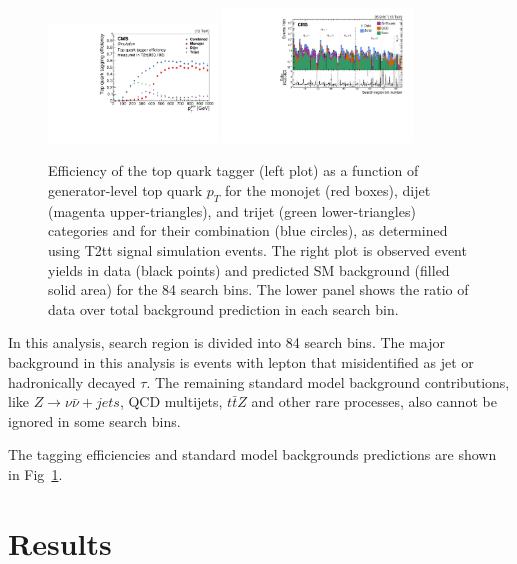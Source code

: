 \documentclass{PoS}
\begin{document}
\begin{figure}[htbp]
 \begin{center}
  \includegraphics[width=0.40\textwidth]{figures/Tagger_Paper.pdf}
  \includegraphics[width=0.45\textwidth]{figures/UnblindPlots.pdf}
 \end{center}
 \caption
 {
  Efficiency of the top quark tagger (left plot) as a function of generator-level top quark $p_{T}$ for
the monojet (red boxes), dijet (magenta upper-triangles), and trijet (green lower-triangles) categories
and for their combination (blue circles), as determined using T2tt signal simulation events. The right plot is observed event yields in data (black points) and predicted SM background (filled solid area) for the 84 search bins. The lower panel shows the ratio of data over total background prediction in each search bin.
 }
 \label{fig:taggerAndBG}
\end{figure}
\clearpage

In this analysis, search region is divided into 84 search bins\cite{CMS-PAS-SUS-16-050}. The major background in this analysis is events with lepton that misidentified as jet or hadronically decayed $\tau$. The remaining standard model background contributions, like $Z \rightarrow \nu\bar{\nu}+jets$, QCD multijets, $t\bar{t}Z$ and other rare processes, also cannot be ignored in some search bins.

The tagging efficiencies and standard model backgrounds predictions are shown in Fig~\ref{fig:taggerAndBG}.

\section{Results}
\end{document}
